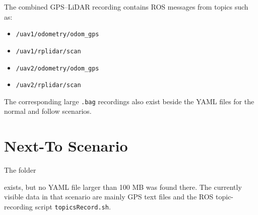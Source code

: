 \documentclass[a4paper]{article}
\begin{document}
      The combined GPS--LiDAR recording contains ROS messages from topics such as:

      \begin{itemize}
         \item \texttt{/uav1/odometry/odom\_gps}
         \item \texttt{/uav1/rplidar/scan}
         \item \texttt{/uav2/odometry/odom\_gps}
         \item \texttt{/uav2/rplidar/scan}
      \end{itemize}

      The corresponding large \texttt{.bag} recordings also exist beside the YAML files for the normal and follow scenarios.

   \section{Next-To Scenario}

      The folder

      \texttt{}

      exists, but no YAML file larger than 100 MB was found there. The currently visible data in that scenario are mainly GPS text files and the ROS topic-recording script \texttt{topicsRecord.sh}.
\end{document}
